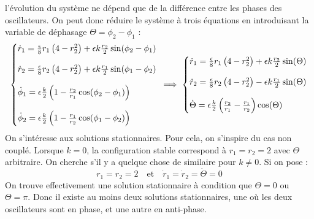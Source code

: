 l'évolution du système ne dépend que de la différence entre les phases des oscillateurs. 
On peut donc réduire le système à trois équations en introduisant la variable de déphasage $\Theta = \phi_2 - \phi_1$ :
%
\begin{equation}
    \left\{\begin{array}{@{}l@{}}
        \dot{r}_1 =  \frac{\epsilon}{8} r_1 \left( 4 - r_2^2 \right) + \epsilon k\frac{r_2}{2}\sin(\phi_2 - \phi_1)\\
        \\
        \dot{r}_2 =  \frac{\epsilon}{8} r_2 \left( 4 - r_2^2 \right) + \epsilon k\frac{r_1}{2}\sin(\phi_1 - \phi_2)\\
        \\
        \dot{\phi}_1 = \epsilon \frac{k}{2}\left( 1 - \frac{r_2}{r_1}\cos(\phi_2 - \phi_1)\right) \\
        \\
        \dot{\phi}_2 = \epsilon \frac{k}{2}\left( 1 - \frac{r_1}{r_2}\cos(\phi_1 - \phi_2)\right)
    \end{array}\right.\,
    \implies
    \left\{\begin{array}{@{}l@{}}
        \dot{r}_1 = \frac{\epsilon}{8} r_1 \left( 4 - r_2^2 \right) + \epsilon k\frac{r_2}{2}\sin(\Theta)\\
        \\
        \dot{r}_2 = \frac{\epsilon}{8} r_2 \left( 4 - r_2^2 \right) - \epsilon k\frac{r_1}{2}\sin(\Theta) \\
        \\
      \dot{\Theta} = \epsilon \frac{k}{2}\left(  \frac{r_2}{r_1} - \frac{r_1}{r_2} \right)\cos(\Theta)
    \end{array}\right.\,
  \end{equation}
  On s'intéresse aux solutions stationnaires. Pour cela, on s'inspire du cas non couplé. Lorsque $k=0$, la configuration stable correspond à $r_1 = r_2 = 2 $
avec $\Theta$ arbitraire.
%
On cherche s'il y a quelque chose de similaire pour $k \neq 0$. Si on pose :
\[r_1 = r_2 = 2 \quad \text{et} \quad \dot{r}_1 = \dot{r}_2 = \dot{\Theta} = 0\]
On trouve effectivement une solution stationnaire à condition que $\Theta = 0$ ou $\Theta = \pi$. Donc il existe au moins deux solutions stationnaires, une où les deux oscillateurs sont en phase, et une autre en anti-phase.
%
